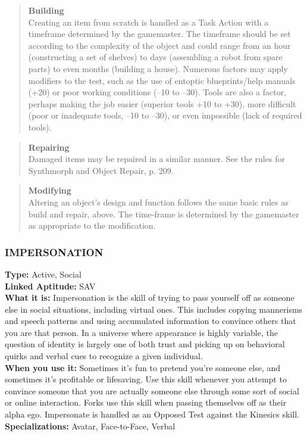\begin{quotation} \textbf{Building} \\ Creating an item from scratch is handled as a Task Action with a timeframe determined by the gamemaster. The timeframe should be set according to the complexity of the object and could range from an hour (constructing a set of shelves) to days (assembling a robot from spare parts) to even months (building a house). Numerous factors may apply modifiers to the test, such as the use of entoptic blueprints/help manuals (+20) or poor working conditions (–10 to –30). Tools are also a factor, perhaps making the job easier (superior tools +10 to +30), more difficult (poor or inadequate tools, –10 to –30), or even impossible (lack of required tools). \end{quotation} 

\begin{quotation} \textbf{Repairing} \\ Damaged items may be repaired in a similar manner. See the rules for Synthmorph and Object Repair, p. 209. \end{quotation} 



\begin{quotation} \textbf{Modifying} \\ Altering an object’s design and function follows the same basic rules as build and repair, above. The time-frame is determined by the gamemaster as appropriate to the modification. \end{quotation} 









\subsubsection{IMPERSONATION} \textbf{Type:} Active, Social \\ \textbf{Linked Aptitude:} SAV \\ \textbf{What it is:} Impersonation is the skill of trying to pass yourself off as someone else in social situations, including virtual ones. This includes copying mannerisms and speech patterns and using accumulated information to convince others that you are that person. In a universe where appearance is highly variable, the question of identity is largely one of both trust and picking up on behavioral quirks and verbal cues to recognize a given individual. \\ \textbf{When you use it:} Sometimes it’s fun to pretend you’re someone else, and sometimes it’s profitable or lifesaving. Use this skill whenever you attempt to convince someone that you are actually someone else through some sort of social or online interaction. Forks use this skill when passing themselves off as their alpha ego. Impersonate is handled as an Opposed Test against the Kinesics skill. \\ \textbf{Specializations:} Avatar, Face-to-Face, Verbal 

